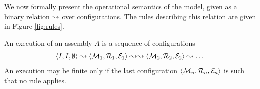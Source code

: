 
    
We now formally present the operational semantics of the \mad model,
given as a binary relation $\leadsto$ over configurations. The rules
describing this relation are given in Figure \ref{fig:rules}.

An execution of an assembly $A$ is a sequence of configurations
\[
\langle I, I, \emptyset \rangle \leadsto \langle \mathcal{M}_1, \mathcal{R}_1, \mathcal{E}_1 \rangle \leadsto \leadsto \langle \mathcal{M}_2, \mathcal{R}_2, \mathcal{E}_2 \rangle \leadsto \dots
\]
An execution may be finite only if the last configuration $\langle
\mathcal{M}_n, \mathcal{R}_n, \mathcal{E}_n \rangle$ is such that no rule applies.

